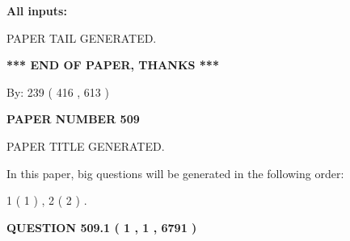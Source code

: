 \documentclass{ctexart}
\begin{document}
   
   
   
\noindent{}
   
   
   
   
\noindent\vspace{0.1in}\hspace{-0.08in} {\textbf{\Large{All inputs: }}}
   
   
   
   
   
   
 \vspace{0.2in}
 
   
   
\vspace{2.0in} PAPER TAIL GENERATED.
   
   
   
   
\vspace{1.0in} 
{\textbf{\large{ *** END OF PAPER, THANKS *** }}} 
   
   
\hspace{1.0in} By: 
 239 ( 416 ,  613 )
   
   
   
   
\newpage 
\setcounter{page}{ 
   509001 } 
   
   
   
   
 {\textbf{ \Large{ PAPER NUMBER  509  }}}
   
   
\vspace{0.2in}
   
   
   
   
   
   
   
   
 \vspace{0.2in}
 
 
 
 
   
   
 PAPER TITLE GENERATED.
   
   
   
\vspace{0.2in}
   
In this paper, big questions will be generated in the following order: 
   
   
   1 ( 1 )
 ,
   2 ( 2 )
 .
  
\vspace{0.2in}
  
{\textbf{\Large{QUESTION
509.1 
 ( 1 , 1 , 6791 )
}}}
  
\end{document}
